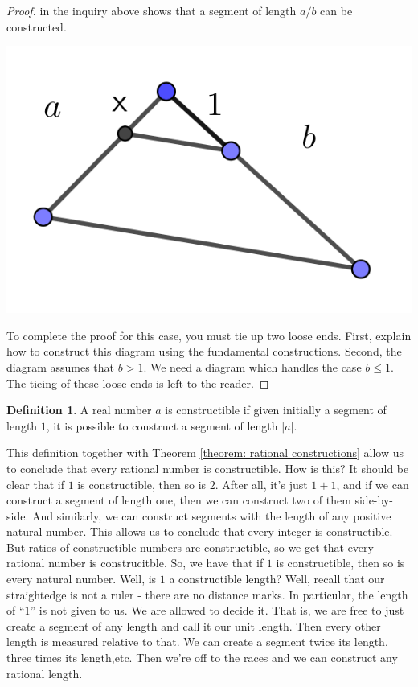 \documentclass[11pt]{article}
\theoremstyle{definition}
\newtheorem{definition}[theorem]{Definition}
\begin{document}
\begin{proof}
  in the inquiry above shows that a segment of length $a/b$ can be constructed.
  \begin{center}
    \includegraphics[scale=.1]{Images/a_over_b.png}
  \end{center}
  To complete the proof for this case, you must tie up two loose ends. First, explain how to construct this diagram using the fundamental
  constructions. Second, the diagram assumes that $b>1$. We need a diagram which handles the case $b \leq 1$. The tieing of these loose ends
  is left to the reader.
\end{proof}

\begin{definition}
  A real number $a$ is constructible if given initially a segment of length $1$, it is possible to construct a segment of length $|a|$.
\end{definition}

This definition together with Theorem \ref{theorem: rational constructions} allow us to conclude that every rational number is constructible. How is this?
It should be clear that if $1$ is constructible, then so is $2$. After all, it's just $1+1$, and if we can construct a segment of length one, then
we can construct two of them side-by-side. And similarly, we can construct segments with the length of any positive natural number. This allows us
to conclude that every integer is constructible. But ratios of constructible numbers are constructible, so we get that every rational number is 
construcitble. So, we have that if $1$ is constructible, then so is every natural number. Well, is $1$ a constructible length? Well, recall that our
straightedge is not a ruler - there are no distance marks. In particular, the length of ``$1$'' is not given to us. We are allowed to decide it. That is,
we are free to just create a segment of any length and call it our unit length. Then every other length is measured relative to that. We can create
a segment twice its length, three times its length,etc. Then we're off to the races and we can construct any rational length.
\end{document}
